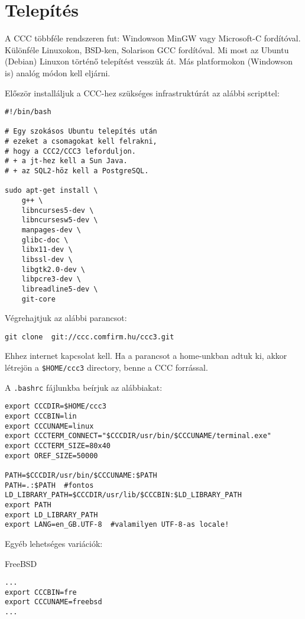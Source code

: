 
\section{Telepítés}\label{INSTALL}

A CCC többféle rendszeren fut: 
Windowson MinGW vagy Microsoft-C fordítóval.
Különféle Linuxokon, BSD-ken, Solarison GCC fordítóval.
Mi most az Ubuntu (Debian) Linuxon történő telepítést vesszük át.
Más platformokon (Windowson is) analóg módon kell eljárni.

Először  installáljuk a CCC-hez szükséges infrastruktúrát
az alábbi scripttel:

\begin{verbatim}
#!/bin/bash

# Egy szokásos Ubuntu telepítés után
# ezeket a csomagokat kell felrakni,
# hogy a CCC2/CCC3 leforduljon.
# + a jt-hez kell a Sun Java.
# + az SQL2-höz kell a PostgreSQL.

sudo apt-get install \
    g++ \
    libncurses5-dev \
    libncursesw5-dev \
    manpages-dev \
    glibc-doc \
    libx11-dev \
    libssl-dev \
    libgtk2.0-dev \
    libpcre3-dev \
    libreadline5-dev \
    git-core
\end{verbatim}

Végrehajtjuk az alábbi parancsot:
\begin{verbatim}
git clone  git://ccc.comfirm.hu/ccc3.git
\end{verbatim}
Ehhez internet kapcsolat kell. Ha a parancsot a home-unkban adtuk ki, 
akkor létrejön a \verb!$HOME/ccc3! directory, benne a CCC forrással.

A \verb!.bashrc! fájlunkba beírjuk az alábbiakat:

\begin{verbatim}
export CCCDIR=$HOME/ccc3
export CCCBIN=lin
export CCCUNAME=linux
export CCCTERM_CONNECT="$CCCDIR/usr/bin/$CCCUNAME/terminal.exe"
export CCCTERM_SIZE=80x40
export OREF_SIZE=50000

PATH=$CCCDIR/usr/bin/$CCCUNAME:$PATH
PATH=.:$PATH  #fontos
LD_LIBRARY_PATH=$CCCDIR/usr/lib/$CCCBIN:$LD_LIBRARY_PATH
export PATH 
export LD_LIBRARY_PATH
export LANG=en_GB.UTF-8  #valamilyen UTF-8-as locale!
\end{verbatim}

Egyéb lehetséges variációk:

FreeBSD
\begin{verbatim}
...
export CCCBIN=fre
export CCCUNAME=freebsd
...
\end{verbatim}


